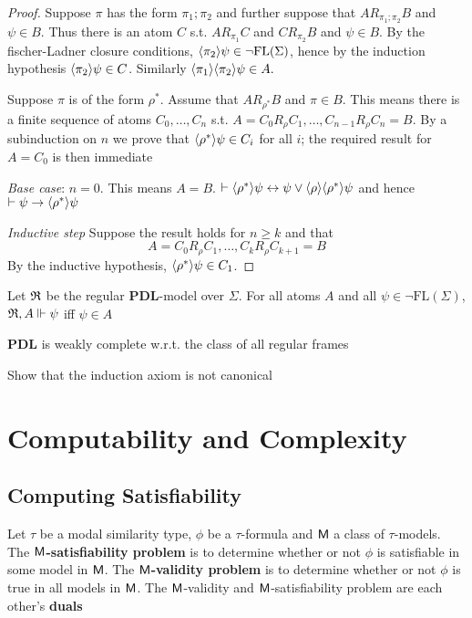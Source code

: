 \documentclass[11pt]{article}
\newcommand{\FL}{\text{FL}}
\newcommand{\PDL}{\textbf{PDL}}
\begin{document}
\begin{proof}
Suppose \(\pi\) has the form \(\pi_1;\pi_2\) and further suppose that
\(AR_{\pi_1;\pi_2}B\) and \(\psi\in B\). Thus there is an atom \(C\) s.t.
\(AR_{\pi_1}C\) and \(CR_{\pi_2}B\) and \(\psi\in B\). By the fischer-Ladner
closure conditions, \(\la\pi_2\ra\psi\in\neg\FL(\Sigma)\), hence by the induction
hypothesis \(\langle\pi_2\rangle\psi\in C\). Similarly
\(\langle\pi_1\rangle\langle\pi_2\rangle\psi\in A.\)

Suppose \(\pi\) is of the form \(\rho^*\). Assume that \(AR_{\rho^*}B\) and
\(\pi\in B\). This means there is a finite sequence of atoms
\(C_0,\dots,C_n\) s.t. \(A=C_0R_\rho C_1,\dots,C_{n-1}R_\rho C_n=B\). By a
subinduction on \(n\) we prove that \(\langle\rho^*\rangle\psi\in C_i\) for all
\(i\); the required result for \(A=C_0\) is then immediate

\emph{Base case}: \(n=0\). This means \(A=B\).
\(\vdash\langle\rho^*\rangle\psi\leftrightarrow\psi\vee\langle\rho\rangle\langle\rho^*\rangle\psi\)
and hence \(\vdash\psi\to\langle\rho^*\rangle\psi\)

\emph{Inductive step} Suppose the result holds for \(n\ge k\) and that
\begin{equation*}
A=C_0R_\rho C_1,\dots,C_kR_\rho C_{k+1}=B
\end{equation*}
By the inductive hypothesis, \(\langle\rho^*\rangle\psi\in C_1\). 
\end{proof}

\begin{lemma}
Let \(\mathfrak{R}\) be the regular \(\PDL\)-model over \(\Sigma\). For all atoms \(A\) and all
\(\psi\in\neg\FL(\Sigma)\), \(\mathfrak{R},A\Vdash\psi\) iff \(\psi\in A\)
\end{lemma}

\begin{theorem}[]
\(\PDL\) is weakly complete w.r.t. the class of all regular frames
\end{theorem}

\begin{exercise}
Show that the induction axiom is not canonical
\end{exercise}
\section{Computability and Complexity}
\label{sec:org03911ba}
\subsection{Computing Satisfiability}
\label{sec:org6de117b}
\begin{definition}
Let \(\tau\) be a modal similarity type, \(\phi\) be a \(\tau\)-formula and \(\textsf{M}\) a
class of \(\tau\)-models. The \textbf{\(\textsf{M}\)-satisfiability problem} is to determine
whether or not \(\phi\) is satisfiable in some model in \(\textsf{M}\). The
\textbf{\(\textsf{M}\)-validity problem} is to determine whether or not \(\phi\) is true in all
models in \(\textsf{M}\). The \(\textsf{M}\)-validity and \(\textsf{M}\)-satisfiability problem
are each other's \textbf{duals}
\end{definition}
\end{document}
